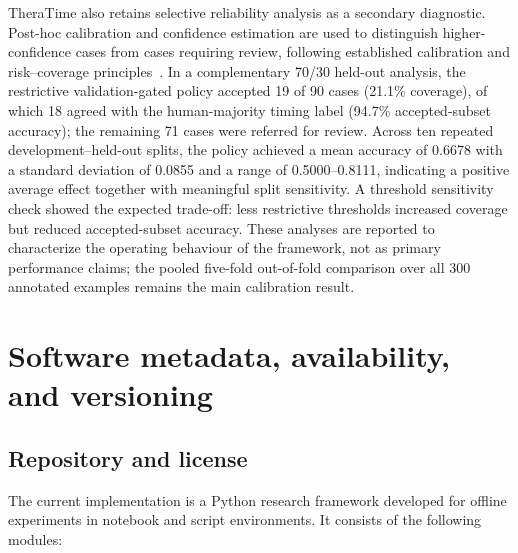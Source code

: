 \documentclass[preprint,12pt,a4paper]{elsarticle}
\begin{document}
TheraTime also retains selective reliability analysis as a secondary diagnostic. Post-hoc calibration and confidence estimation are used to distinguish higher-confidence cases from cases requiring review, following established calibration and risk--coverage principles~\cite{Guo2017Calibration,Geifman2019SelectiveNet}. In a complementary 70/30 held-out analysis, the restrictive validation-gated policy accepted 19 of 90 cases (21.1\% coverage), of which 18 agreed with the human-majority timing label (94.7\% accepted-subset accuracy); the remaining 71 cases were referred for review. Across ten repeated development--held-out splits, the policy achieved a mean accuracy of 0.6678 with a standard deviation of 0.0855 and a range of 0.5000--0.8111, indicating a positive average effect together with meaningful split sensitivity. A threshold sensitivity check showed the expected trade-off: less restrictive thresholds increased coverage but reduced accepted-subset accuracy. These analyses are reported to characterize the operating behaviour of the framework, not as primary performance claims; the pooled five-fold out-of-fold comparison over all 300 annotated examples remains the main calibration result.

\FloatBarrier

\section{Software metadata, availability, and versioning}
\label{sec:availability}

\subsection{Repository and license}

The current implementation is a Python research framework developed for offline experiments in notebook and script environments. It consists of the following modules:
\end{document}
